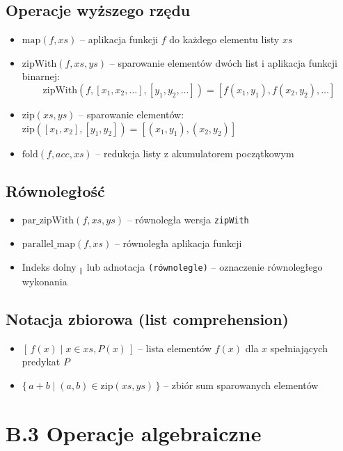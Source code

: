 \subsection*{Operacje wyższego rzędu}
\begin{itemize}
	\item $\text{map}(f, xs)$ -- aplikacja funkcji $f$ do każdego elementu listy $xs$
	\item $\text{zipWith}(f, xs, ys)$ -- sparowanie elementów dwóch list i aplikacja funkcji binarnej:
	      $$\text{zipWith}(f, [x_1, x_2, \ldots], [y_1, y_2, \ldots]) = [f(x_1,y_1), f(x_2,y_2), \ldots]$$
	\item $\text{zip}(xs, ys)$ -- sparowanie elementów: $\text{zip}([x_1, x_2], [y_1, y_2]) = [(x_1,y_1), (x_2,y_2)]$
	\item $\text{fold}(f, acc, xs)$ -- redukcja listy z akumulatorem początkowym
\end{itemize}

\subsection*{Równoległość}
\begin{itemize}
	\item $\text{par\_zipWith}(f, xs, ys)$ -- równoległa wersja \texttt{zipWith}
	\item $\text{parallel\_map}(f, xs)$ -- równoległa aplikacja funkcji
	\item Indeks dolny $_{\parallel}$ lub adnotacja \texttt{(równolegle)} -- oznaczenie równoległego wykonania
\end{itemize}

\subsection*{Notacja zbiorowa (list comprehension)}
\begin{itemize}
	\item $[\, f(x) \mid x \in xs, P(x) \,]$ -- lista elementów $f(x)$ dla $x$ spełniających predykat $P$
	\item $\{\, a + b \mid (a,b) \in \text{zip}(xs, ys) \,\}$ -- zbiór sum sparowanych elementów
\end{itemize}

\section*{B.3 Operacje algebraiczne}

